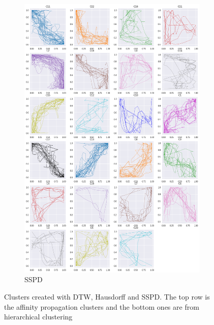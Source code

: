 \begin{figure}[h]
\begin{subfigure}[c]{0.3\linewidth}
     \includegraphics[width=\linewidth]{figs/clusters/CLU_H_ALL[SSPD].png}
    \caption{SSPD}
  \end{subfigure}
  \caption{Clusters created with DTW, Hausdorff and SSPD. The top row is the affinity propagation clusters and the bottom ones are from hierarchical clustering}
  \label{fig:cluster-dtw-hd-sspd}
\end{figure}







